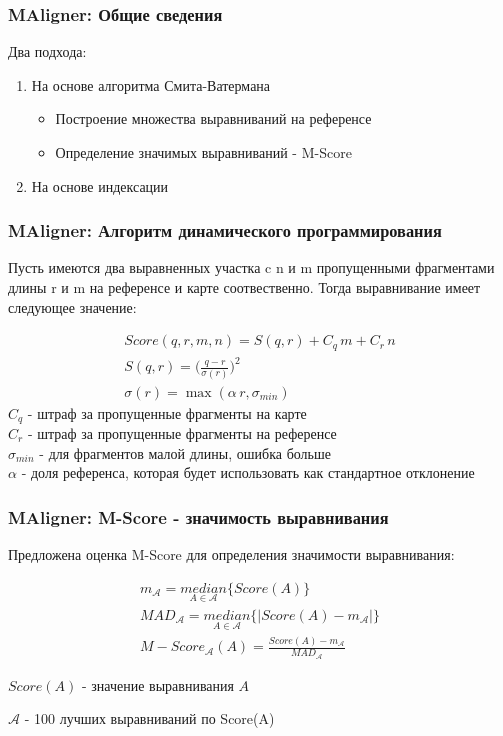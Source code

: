 \begin{frame}
\frametitle{MAligner\nocite{maligner}: Общие сведения}
Два подхода:
\begin{enumerate}
  \item На основе алгоритма Смита-Ватермана
  \begin{itemize}
    \item Построение множества выравниваний на референсе
    \item Определение значимых выравниваний - M-Score
  \end{itemize}
  \item На основе индексации
\end{enumerate}
\end{frame}

\begin{frame}
\frametitle{MAligner: Алгоритм динамического программирования}

Пусть имеются два выравненных участка c n и m пропущенными фрагментами длины r и m на референсе и карте соотвественно.
Тогда выравнивание имеет следующее значение:

\begin{gather*}
Score(q, r, m, n) = S(q, r) + C_q \,m + C_r \, n \\
S(q, r) = \bigg(\frac{q - r}{\sigma(r)}\bigg)^2 \\
\sigma(r) = \max(\alpha \, r, \sigma_{min})
\end{gather*}
$C_q$ - штраф за пропущенные фрагменты на карте \\
$C_r$ - штраф за пропущенные фрагменты на референсе \\
$\sigma_{min}$ - для фрагментов малой длины, ошибка больше \\
$\alpha$ - доля референса, которая будет использовать как стандартное отклонение
\end{frame}

\begin{frame}
\frametitle{MAligner: M-Score - значимость выравнивания}

Предложена оценка M-Score для определения значимости выравнивания:

\begin{gather*}
  m_{\mathcal{A}} = \underset{A \in \mathcal{A}}{median}\{Score(A)\} \\
  MAD_{\mathcal{A}} = \underset{A \in \mathcal{A}}{median}\{ | Score(A) - m_{\mathcal{A}}|\} \\
  M-Score_{\mathcal{A}}(A) = \frac{Score(A) - m_{\mathcal{A}}}{MAD_{\mathcal{A}}}
\end{gather*}

$Score(A)$ - значение выравнивания $A$

$\mathcal{A}$ - 100 лучших выравниваний по Score(A)
\end{frame}


